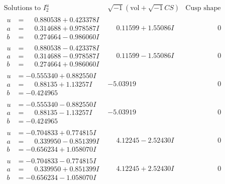 \documentclass[1p]{elsarticle_modified}
\theoremstyle{definition}
\newcommand{\I}{\sqrt{-1}}
\begin{document}
$$\begin{array}{c|c|c}  
\text{Solutions to }I^u_{2}& \I (\text{vol} + \sqrt{-1}CS) & \text{Cusp shape}\\
 \hline 
\begin{aligned}
u &= \phantom{-}0.880538 + 0.423378 I \\
a &= \phantom{-}0.314688 + 0.978587 I \\
b &= \phantom{-}0.274664 - 0.986060 I\end{aligned}
 & \phantom{-}0.11599 + 1.55086 I & \phantom{-0.000000 } 0 \\ \hline\begin{aligned}
u &= \phantom{-}0.880538 - 0.423378 I \\
a &= \phantom{-}0.314688 - 0.978587 I \\
b &= \phantom{-}0.274664 + 0.986060 I\end{aligned}
 & \phantom{-}0.11599 - 1.55086 I & \phantom{-0.000000 } 0 \\ \hline\begin{aligned}
u &= -0.555340 + 0.882550 I \\
a &= \phantom{-}0.88135 + 1.13257 I \\
b &= -0.424965\phantom{ +0.000000I}\end{aligned}
 & -5.03919\phantom{ +0.000000I} & \phantom{-0.000000 } 0 \\ \hline\begin{aligned}
u &= -0.555340 - 0.882550 I \\
a &= \phantom{-}0.88135 - 1.13257 I \\
b &= -0.424965\phantom{ +0.000000I}\end{aligned}
 & -5.03919\phantom{ +0.000000I} & \phantom{-0.000000 } 0 \\ \hline\begin{aligned}
u &= -0.704833 + 0.774815 I \\
a &= \phantom{-}0.339950 - 0.851399 I \\
b &= -0.656234 + 1.058070 I\end{aligned}
 & \phantom{-}4.12245 - 2.52430 I & \phantom{-0.000000 } 0 \\ \hline\begin{aligned}
u &= -0.704833 - 0.774815 I \\
a &= \phantom{-}0.339950 + 0.851399 I \\
b &= -0.656234 - 1.058070 I\end{aligned}
 & \phantom{-}4.12245 + 2.52430 I & \phantom{-0.000000 } 0 \\ \hline\begin{aligned}

\end{aligned}
\end{array}$$
\end{document}
